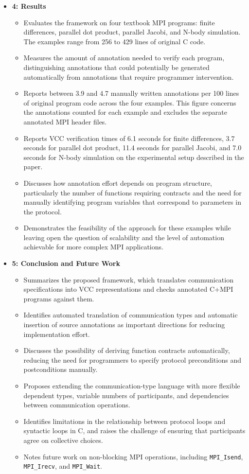 \begin{itemize}
    \item \textbf{4: Results}
    \begin{itemize}
        \item Evaluates the framework on four textbook MPI programs: finite differences, parallel dot product, parallel Jacobi, and N-body simulation. The examples range from 256 to 429 lines of original C code.
        \item Measures the amount of annotation needed to verify each program, distinguishing annotations that could potentially be generated automatically from annotations that require programmer intervention.
        \item Reports between 3.9 and 4.7 manually written annotations per 100 lines of original program code across the four examples. This figure concerns the annotations counted for each example and excludes the separate annotated MPI header files.
        \item Reports VCC verification times of 6.1 seconds for finite differences, 3.7 seconds for parallel dot product, 11.4 seconds for parallel Jacobi, and 7.0 seconds for N-body simulation on the experimental setup described in the paper.
        \item Discusses how annotation effort depends on program structure, particularly the number of functions requiring contracts and the need for manually identifying program variables that correspond to parameters in the protocol.
        \item Demonstrates the feasibility of the approach for these examples while leaving open the question of scalability and the level of automation achievable for more complex MPI applications.
    \end{itemize}

    \item \textbf{5: Conclusion and Future Work}
    \begin{itemize}
        \item Summarizes the proposed framework, which translates communication specifications into VCC representations and checks annotated C+MPI programs against them.
        \item Identifies automated translation of communication types and automatic insertion of source annotations as important directions for reducing implementation effort.
        \item Discusses the possibility of deriving function contracts automatically, reducing the need for programmers to specify protocol preconditions and postconditions manually.
        \item Proposes extending the communication-type language with more flexible dependent types, variable numbers of participants, and dependencies between communication operations.
        \item Identifies limitations in the relationship between protocol loops and syntactic loops in C, and raises the challenge of ensuring that participants agree on collective choices.
        \item Notes future work on non-blocking MPI operations, including \texttt{MPI\_Isend}, \texttt{MPI\_Irecv}, and \texttt{MPI\_Wait}.
    \end{itemize}


\end{itemize}
